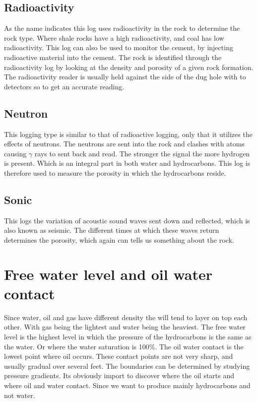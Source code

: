 \documentclass[DIV=calc, paper=a4, fontsize=11pt, twocolumn]{scrartcl}	 %
\begin{document}
\subsection*{Radioactivity}
As the name indicates this log uses radioactivity in the rock to determine the rock type. Where shale rocks have a high radioactivity, and coal has low radioactivity. This log can also be used to monitor the cement, by injecting radioactive material into the cement. The rock is identified through the radioactivity log by looking at the density and porosity of a given rock formation. The radioactivity reader is usually held against the side of the dug hole with to detectors so to get an accurate reading.
\subsection*{Neutron}
This logging type is similar to that of radioactive logging, only that it utilizes the effects of neutrons. The neutrons are sent into the rock and clashes with atoms causing $\gamma$ rays to sent back and read. The stronger the signal the more hydrogen is present. Which is an integral part in both water and hydrocarbons. This log is therefore used to measure the porosity in which the hydrocarbons reside.
\subsection*{Sonic}
This logs the variation of acoustic sound waves sent down and reflected, which is also known as seismic. The different times at which these waves return determines the porosity, which again can tells us something about the rock.

\section*{Free water level and oil water contact }
Since water, oil and gas have different density the will tend to layer on top each other. With gas being the lightest and water being the heaviest.
The free water level is the highest level in which the pressure of the hydrocarbons is the same as the water. Or where the water saturation is 100\%. The oil water contact is the lowest point where oil occurs. These contact points are not very sharp, and usually gradual over several feet. The boundaries can be determined by studying pressure gradients. Its obviously import to discover where the oil starts and where oil and water contact. Since we want to produce mainly hydrocarbons and not water.
\end{document}
